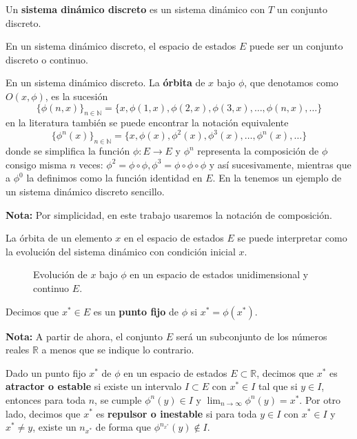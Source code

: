 \documentclass[../Main.tex]{subfiles}
\begin{document}
\begin{definition}
    Un \textbf{sistema dinámico discreto} es un sistema dinámico con $T$ un conjunto discreto. 
\end{definition}
\begin{remark}
    En un sistema dinámico discreto, el espacio de estados $E$ puede ser un conjunto discreto o continuo.
\end{remark}
\begin{definition}
    En un sistema dinámico discreto. La \textbf{órbita} de $x$ bajo $\phi$, que denotamos como $O(x,\phi)$, es la sucesión \[\{\phi(n,x)\}_{n\in\mathbb{N}}=\{x,\phi(1,x),\phi(2,x),\phi(3,x),\dots,\phi(n,x),\dots\}\]
en la literatura también se puede encontrar la notación equivalente
    \[\{\phi^n(x)\}_{n\in\mathbb{N}}=\{x,\phi(x),\phi^2(x),\phi^3(x),\dots,\phi^n(x),\dots\}\]
    donde se simplifica la función $\phi : E\rightarrow E$ y $\phi^n$ representa la composición de $\phi$ consigo misma $n$ veces: $\phi^2=\phi\circ \phi, \phi^3=\phi\circ \phi\circ \phi$ y así sucesivamente, mientras que a $\phi^0$ la definimos como la función identidad en $E$. En la  tenemos un ejemplo de un sistema dinámico discreto sencillo. 
\end{definition}
\textbf{Nota:} Por simplicidad, en este trabajo usaremos la notación de composición.

La órbita de un elemento $x$ en el espacio de estados $E$ se puede interpretar como la evolución del sistema dinámico con condición inicial $x$.

\begin{figure}[h!]
    \centering
    \caption{Evolución de $x$ bajo $\phi$ en un espacio de estados unidimensional y continuo $E$.}
    \label{Sdd}
\end{figure}


\begin{definition}
    Decimos que $x^*\in E$ es un \textbf{punto fijo} de $\phi$ si $x^*=\phi(x^*)$.
\end{definition}
\textbf{Nota:} A partir de ahora, el conjunto $E$ será un subconjunto de los números reales $\mathbb{R}$ a menos que se indique lo contrario.
\begin{definition}
\label{def:p_fijos}
    Dado un punto fijo $x^*$ de $\phi$ en un espacio de estados $E\subset\mathbb{R}$, decimos que $x^*$ es \textbf{atractor o estable} si existe un intervalo $I\subset E$ con $x^*\in I$ tal que si $y\in I$, entonces para toda $n$, se cumple $\phi^n(y)\in I$ y $\lim_{n\rightarrow\infty}\phi^n(y)=x^*$. Por otro lado, decimos que $x^*$ es \textbf{repulsor o inestable} si para toda $y\in I$ con $x^*\in I$ y $x^*\neq y$, existe un $n_{x^*}$ de forma que $\phi^{n_{x^*}}(y)\notin I$.
\end{definition}
\end{document}
